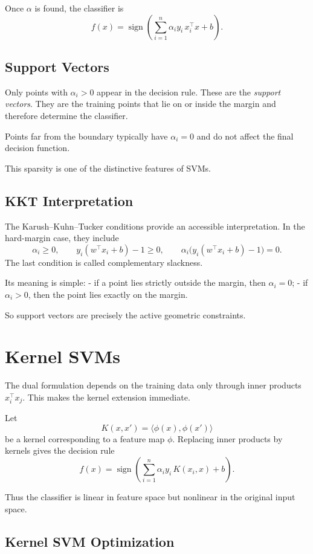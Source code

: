 Once $\alpha$ is found, the classifier is
\[
f(x)=\operatorname{sign}\!\left(\sum_{i=1}^n \alpha_i y_i\, x_i^\top x + b\right).
\]

\subsection{Support Vectors}

Only points with $\alpha_i>0$ appear in the decision rule. These are the \emph{support vectors}. They are the training points that lie on or inside the margin and therefore determine the classifier.

Points far from the boundary typically have $\alpha_i=0$ and do not affect the final decision function.

This sparsity is one of the distinctive features of SVMs.

\subsection{KKT Interpretation}

The Karush--Kuhn--Tucker conditions provide an accessible interpretation. In the hard-margin case, they include
\[
\alpha_i\ge 0,
\qquad
y_i(w^\top x_i+b)-1\ge 0,
\qquad
\alpha_i\bigl(y_i(w^\top x_i+b)-1\bigr)=0.
\]
The last condition is called complementary slackness.

Its meaning is simple:
- if a point lies strictly outside the margin, then $\alpha_i=0$;
- if $\alpha_i>0$, then the point lies exactly on the margin.

So support vectors are precisely the active geometric constraints.

\section{Kernel SVMs}

The dual formulation depends on the training data only through inner products $x_i^\top x_j$. This makes the kernel extension immediate.

Let
\[
K(x,x')=\langle \phi(x),\phi(x')\rangle
\]
be a kernel corresponding to a feature map $\phi$. Replacing inner products by kernels gives the decision rule
\[
f(x)=\operatorname{sign}\!\left(\sum_{i=1}^n \alpha_i y_i\, K(x_i,x)+b\right).
\]

Thus the classifier is linear in feature space but nonlinear in the original input space.

\subsection{Kernel SVM Optimization}

